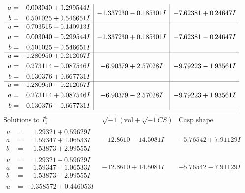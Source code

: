 \documentclass[1p]{elsarticle_modified}
\theoremstyle{definition}
\newcommand{\I}{\sqrt{-1}}
\begin{document}
$$\begin{array}{c|c|c}
\begin{aligned}
a &= \phantom{-}0.003040 + 0.299544 I \\
b &= \phantom{-}0.501025 + 0.546651 I\end{aligned}
 & -1.337230 - 0.185301 I & -7.62381 + 0.24647 I \\ \hline\begin{aligned}
u &= \phantom{-}0.703515 - 0.140913 I \\
a &= \phantom{-}0.003040 - 0.299544 I \\
b &= \phantom{-}0.501025 - 0.546651 I\end{aligned}
 & -1.337230 + 0.185301 I & -7.62381 - 0.24647 I \\ \hline\begin{aligned}
u &= -1.280950 + 0.212067 I \\
a &= \phantom{-}0.273114 - 0.087546 I \\
b &= \phantom{-}0.130376 + 0.667731 I\end{aligned}
 & -6.90379 + 2.57028 I & -9.79223 - 1.93561 I \\ \hline\begin{aligned}
u &= -1.280950 - 0.212067 I \\
a &= \phantom{-}0.273114 + 0.087546 I \\
b &= \phantom{-}0.130376 - 0.667731 I\end{aligned}
 & -6.90379 - 2.57028 I & -9.79223 + 1.93561 I\\
 \hline 
 \end{array}$$\newpage$$\begin{array}{c|c|c}  
\text{Solutions to }I^u_{1}& \I (\text{vol} + \sqrt{-1}CS) & \text{Cusp shape}\\
 \hline 
\begin{aligned}
u &= \phantom{-}1.29321 + 0.59629 I \\
a &= \phantom{-}1.59347 + 1.06533 I \\
b &= \phantom{-}1.53873 + 2.99555 I\end{aligned}
 & -12.8610 - 14.5081 I & -5.76542 + 7.91129 I \\ \hline\begin{aligned}
u &= \phantom{-}1.29321 - 0.59629 I \\
a &= \phantom{-}1.59347 - 1.06533 I \\
b &= \phantom{-}1.53873 - 2.99555 I\end{aligned}
 & -12.8610 + 14.5081 I & -5.76542 - 7.91129 I \\ \hline\begin{aligned}
u &= -0.358572 + 0.446053 I \\

\end{aligned}
\end{array}$$
\end{document}
